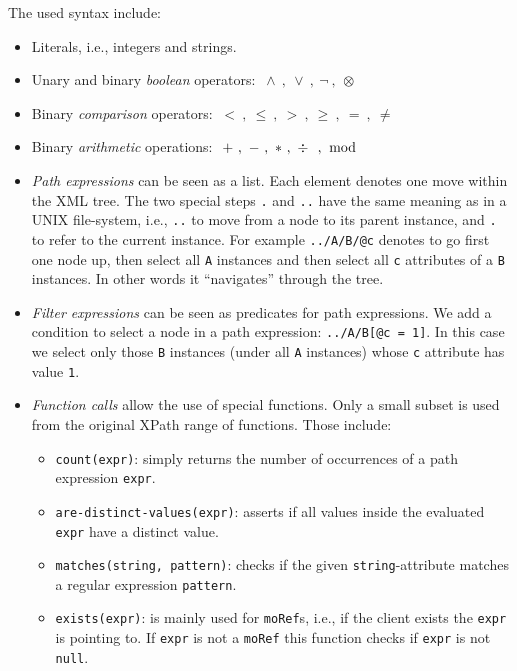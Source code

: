 The used syntax include:
\begin{itemize}
 \item Literals, i.e., integers and strings.
 
 \item Unary and binary \emph{boolean} operators: $\ \wedge\ ,\ \vee\ ,\ \neg\ , \ \otimes\ $
 
 \item Binary \emph{comparison} operators: $\ <\ , \ \leq\ , \ >\  ,\ \geq\ , \ =\ , \ \neq\ $
 
 \item Binary \emph{arithmetic} operations: $\ +\ , \ -\ , \ \ast\ , \ \div\ \ ,\ \bmod$
 
 \item \emph{Path expressions} can be seen as a list. Each element denotes one move within the XML tree. The two special steps \verb|.| and \verb|..| have the same meaning as in a UNIX file-system, i.e., \verb|..| to move from a node to its parent instance, and \verb|.| to refer to the current instance. For example \verb|../A/B/@c| denotes to go first one node up, then select all \verb|A| instances and then select all \verb|c| attributes of a \verb|B| instances. In other words it ``navigates'' through the tree.
 
 \item \emph{Filter expressions} can be seen as predicates for path expressions. We add a condition to select a node in a path expression: \verb|../A/B[@c = 1]|. In this case we select only those \verb|B| instances (under all \verb|A| instances) whose \verb|c| attribute has value \verb|1|. 
 
 \item \emph{Function calls} allow the use of special functions. Only a small subset is used from the original XPath range of functions. Those include:
 \begin{itemize}
  \item \verb|count(expr)|: simply returns the number of occurrences of a path expression \verb|expr|.
  
  \item \verb|are-distinct-values(expr)|: asserts if all values inside the evaluated \verb|expr| have 
  a distinct value.
  
  \item \verb|matches(string, pattern)|: checks if the given \verb|string|-attribute matches a regular expression \verb|pattern|.
  
  \item \verb|exists(expr)|: is mainly used for \verb|moRef|s, i.e., if the client exists the \verb|expr| is pointing to. If \verb|expr| is not a \verb|moRef| this function checks if \verb|expr| is not \verb|null|.
  

\end{itemize}
\end{itemize}
